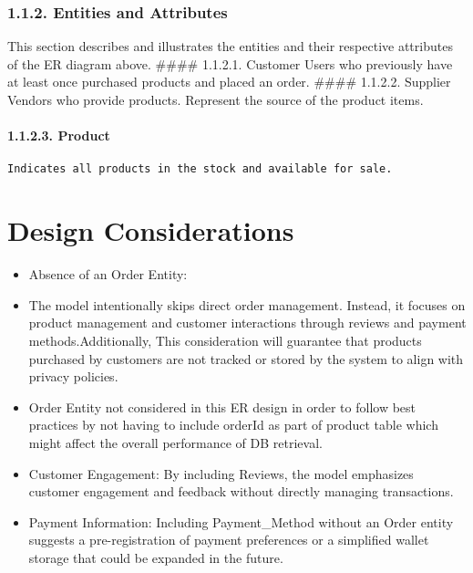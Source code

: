 \documentclass[
]{article}
\begin{document}
\hypertarget{entities-and-attributes}{%
\subsubsection{1.1.2. Entities and
Attributes}\label{entities-and-attributes}}

This section describes and illustrates the entities and their respective
attributes of the ER diagram above. \#\#\#\# 1.1.2.1. Customer Users who
previously have at least once purchased products and placed an order.
\#\#\#\# 1.1.2.2. Supplier Vendors who provide products. Represent the
source of the product items.

\hypertarget{product}{%
\paragraph{1.1.2.3. Product}\label{product}}

\begin{verbatim}
Indicates all products in the stock and available for sale.
\end{verbatim}

\hypertarget{design-considerations}{%
\section{Design Considerations}\label{design-considerations}}

\begin{itemize}
\item
  Absence of an Order Entity:
\item
  The model intentionally skips direct order management. Instead, it
  focuses on product management and customer interactions through
  reviews and payment methods.Additionally, This consideration will
  guarantee that products purchased by customers are not tracked or
  stored by the system to align with privacy policies.
\item
  Order Entity not considered in this ER design in order to follow best
  practices by not having to include orderId as part of product table
  which might affect the overall performance of DB retrieval.
\item
  Customer Engagement: By including Reviews, the model emphasizes
  customer engagement and feedback without directly managing
  transactions.
\item
  Payment Information: Including Payment\_Method without an Order entity
  suggests a pre-registration of payment preferences or a simplified
  wallet storage that could be expanded in the future.
\end{itemize}
\end{document}
